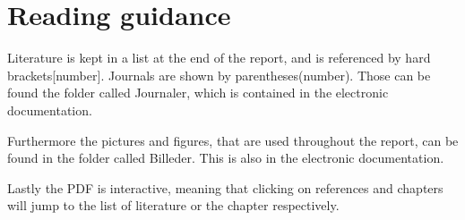 \documentclass[../../main]{subfiles}
\begin{document}
\section{Reading guidance}

Literature is kept in a list at the end of the report, and is referenced by hard brackets[number].
Journals are shown by parentheses(number).
Those can be found the folder called Journaler, which is contained in the electronic documentation.

Furthermore the pictures and figures, that are used throughout the report, can be found in the folder called Billeder. This is also in the electronic documentation.

Lastly the PDF is interactive, meaning that clicking on references and chapters will jump to the list of literature or the chapter respectively.
\end{document}
